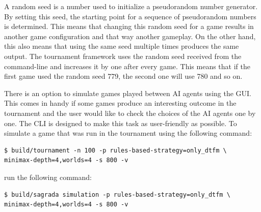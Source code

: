 A random seed is a number used to initialize a pseudorandom number generator. By setting this seed, the starting point for a sequence of pseudorandom numbers
is determined. This means that changing this random seed for a game results in another game configuration and that way another gameplay. On the other hand,
this also means that using the same seed multiple times produces the same output. The tournament framework uses the random seed received from the command-line
and increases it by one after every game. This means that if the first game used the random seed 779, the second one will use 780 and so on.

There is an option to simulate games played between AI agents using the GUI. This comes in handy if some games produce an interesting outcome in the tournament and the user
would like to check the choices of the AI agents one by one. The CLI is designed to make this task as user-friendly as possible. To simulate a game
that was run in the tournament using the following command:
\begin{verbatim}
$ build/tournament -n 100 -p rules-based-strategy=only_dtfm \
minimax-depth=4,worlds=4 -s 800 -v
\end{verbatim}

run the following command:

\begin{verbatim}
$ build/sagrada simulation -p rules-based-strategy=only_dtfm \
minimax-depth=4,worlds=4 -s 800 -v
\end{verbatim}
  






